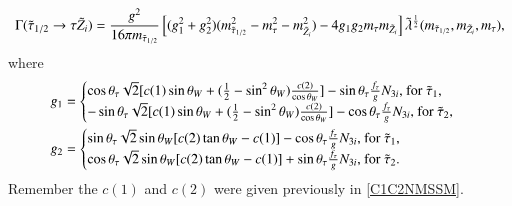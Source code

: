 \documentclass[final,3p,times,pdflatex]{elsarticle}
\begin{document}
\begin{equation} \label{stautauneutNMSSM}
\Gamma(\tilde{\tau}_{1/2} \rightarrow \tau \tilde{Z}_i) = {g^2 \over 16 \pi m_{\tilde{\tau}_{1/2}}}\left[(g_{1}^2 + g_{2}^2)(m_{\tilde{\tau}_{1/2}}^2 - m_{\tau}^2 - m_{\tilde{Z}_i}^2) - 4g_{1}g_{2}m_{\tau}m_{\tilde{Z}_i}\right]\tilde{\lambda}^{1 \over 2}(m_{\tilde{\tau}_{1/2}},m_{\tilde{Z}_i},m_{\tau}),
\end{equation}
where
\begin{align}
g_{1} &= \begin{cases}
		\cos\theta_{\tau} \sqrt{2} [c(1) \sin\theta_W + ({1 \over 2} - \sin^2 \theta_W){c(2) \over \cos\theta_W}] - \sin\theta_{\tau} {f_{\tau} \over g} N_{3i} $, for $\tilde{\tau}_1$,$ \\
		-\sin\theta_{\tau} \sqrt{2} [c(1) \sin\theta_W + ({1 \over 2} - \sin^2 \theta_W){c(2) \over \cos\theta_W}] - \cos\theta_{\tau} {f_{\tau} \over g} N_{3i} $, for $\tilde{\tau}_2$,$ \\
		\end{cases} \\
g_{2} &= \begin{cases}
		\sin\theta_{\tau} \sqrt{2} \sin\theta_W [c(2)\tan\theta_W - c(1)] - \cos\theta_{\tau} {f_{\tau} \over g}N_{3i} $, for $\tilde{\tau}_1$,$ \\
		\cos\theta_{\tau} \sqrt{2} \sin\theta_W [c(2)\tan\theta_W - c(1)] + \sin\theta_{\tau} {f_{\tau} \over g}N_{3i}  $, for $\tilde{\tau}_2. \\
		\end{cases}
\end{align}
Remember the $c(1)$ and $c(2)$ were given previously in \eqref{C1C2NMSSM}.
\end{document}
